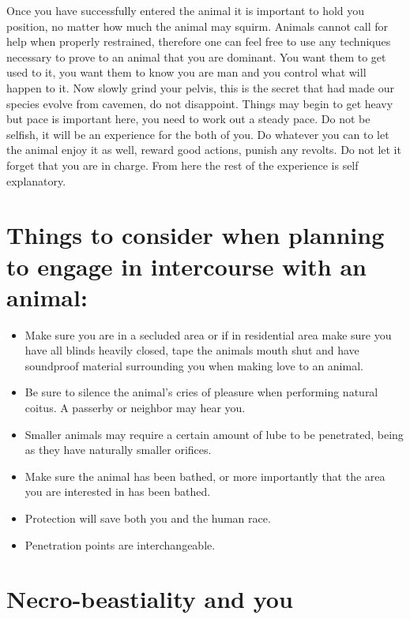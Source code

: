                Once you have successfully entered the animal it is important to 
hold you position, no matter how much the animal may squirm. Animals cannot call 
for help when properly restrained, therefore one can feel free to use any 
techniques necessary to prove to an animal that you are dominant. You want them 
to get used to it, you want them to know you are man and you control what will 
happen to it. Now slowly grind your pelvis, this is the secret that had made our 
species evolve from cavemen, do not disappoint. Things may begin to get heavy 
but pace is important here, you need to work out a steady pace. Do not be 
selfish, it will be an experience for the both of you. Do whatever you can to 
let the animal enjoy it as well, reward good actions, punish any revolts. Do not 
let it forget that you are in charge. From here the rest of the experience is 
self explanatory.

\section*{Things to consider when planning to engage in intercourse with an animal:}
\begin{itemize}
\item Make sure you are in a secluded area or if in residential area make sure you 
have all blinds heavily closed, tape the animals mouth shut and have soundproof 
material surrounding you when making love to an animal.

\item Be sure to silence the animal’s cries of pleasure when performing natural 
coitus. A passerby or neighbor may hear you.

\item Smaller animals may require a certain amount of lube to be penetrated, being 
as they have naturally smaller orifices.

\item Make sure the animal has been bathed, or more importantly that the area you 
are interested in has been bathed.

\item Protection will save both you and the human race.

\item Penetration points are interchangeable.
\end{itemize}
           \section*{Necro-beastiality and you}

